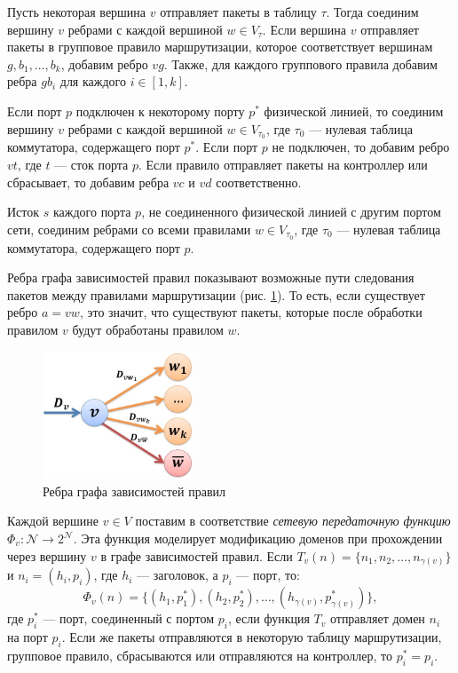 \documentclass[../thesis.tex]{subfiles}
\begin{document}
Пусть некоторая вершина $v$ отправляет пакеты в таблицу $\tau$.
Тогда соединим вершину $v$ ребрами с каждой вершиной $w\in V_{\tau}$.
Если вершина $v$ отправляет пакеты в групповое правило маршрутизации, которое соответствует вершинам $g,b_1,\dots,b_k$, добавим ребро $vg$.
Также, для каждого группового правила добавим ребра $gb_i$ для каждого $i\in [1,k]$.

Если порт $p$ подключен к некоторому порту $p^*$ физической линией, то соединим вершину $v$ ребрами с каждой вершиной $w\in V_{\tau_0}$, где $\tau_0$ --- нулевая таблица коммутатора, содержащего порт $p^*$.
Если порт $p$ не подключен, то добавим ребро $vt$, где $t$ --- сток порта $p$.
Если правило отправляет пакеты на контроллер или сбрасывает, то добавим ребра $vc$ и $vd$ соответственно.

Исток $s$ каждого порта $p$, не соединенного физической линией с другим портом сети, соединим ребрами со всеми правилами $w\in V_{\tau_0}$, где $\tau_0$ --- нулевая таблица коммутатора, содержащего порт $p$.

Ребра графа зависимостей правил показывают возможные пути следования пакетов между правилами маршрутизации (рис. \ref{fig:edges}). То есть, если существует ребро $a=vw$, это значит, что существуют пакеты, которые после обработки правилом $v$ будут обработаны правилом $w$.

\begin{figure}
\centering
\includegraphics[width=0.4\textwidth]{figures/edges.jpg}
\caption{Ребра графа зависимостей правил} \label{fig:edges}
\end{figure}

Каждой вершине $v\in V$ поставим в соответствие \textit{сетевую передаточную функцию} $\Phi_v:\mathcal{N} \rightarrow 2^{\mathcal{N}}$.
Эта функция моделирует модификацию доменов при прохождении через вершину $v$ в графе зависимостей правил.
Если $T_v(n) = \big\{ n_1,n_2,\dots,n_{\gamma(v)} \big\}$ и $n_i = (h_i,p_i)$, где $h_i$ --- заголовок, а $p_i$ --- порт, то:
\begin{equation} \label{eq:network_transfer}
    \Phi_v(n)
    =
    \big\{ (h_1,p^*_1),(h_2,p^*_2),\dots,(h_{\gamma(v)},p^*_{\gamma(v)})\big\},
\end{equation}
где $p^*_i$ --- порт, соединенный с портом $p_i$, если функция $T_v$ отправляет домен $n_i$ на порт $p_i$.
Если же пакеты отправляются в некоторую таблицу маршрутизации, групповое правило, сбрасываются или отправляются на контроллер, то $p^*_i = p_i$.
\end{document}
